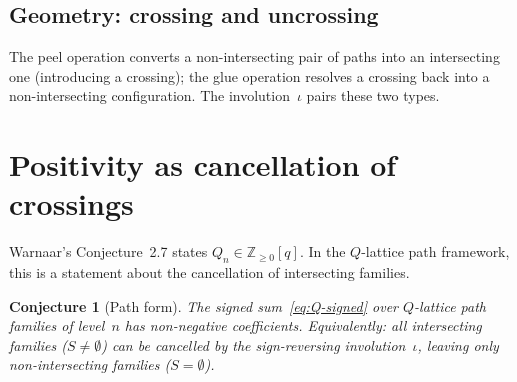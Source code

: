 \documentclass[11pt]{article}
\newcommand{\Z}{\mathbb{Z}}
\theoremstyle{plain}
\newtheorem{conjecture}[theorem]{Conjecture}
\theoremstyle{definition}
\begin{document}
\subsection{Geometry: crossing and uncrossing}

\begin{center}
\end{center}

The peel operation converts a non-intersecting pair of
paths into an intersecting one (introducing a crossing);
the glue operation resolves a crossing back into a
non-intersecting configuration.  The involution~$\iota$
pairs these two types.


\section{Positivity as cancellation of crossings}
\label{sec:positivity}

Warnaar's Conjecture~2.7 states $Q_n \in \Z_{\geq 0}[q]$.
In the $Q$-lattice path framework, this is a statement
about the cancellation of intersecting families.

\begin{conjecture}[Path form]
\label{conj:path}
The signed sum~\eqref{eq:Q-signed} over $Q$-lattice path
families of level~$n$ has non-negative coefficients.
Equivalently: all intersecting families ($S \neq \emptyset$)
can be cancelled by the sign-reversing involution~$\iota$,
leaving only non-intersecting families ($S = \emptyset$).
\end{conjecture}
\end{document}
